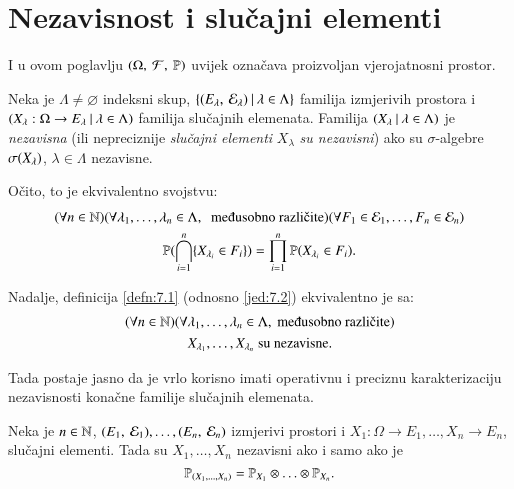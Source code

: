
\chapter{Nezavisnost i slu\v cajni elementi}

I u ovom poglavlju $(\Omega, \: \mathcal{F}, \: \mathbb{P})$ uvijek ozna\v cava proizvoljan vjerojatnosni prostor.

\begin{defn}   \label{defn:7.1}
    Neka je $\Lambda \neq \varnothing$ indeksni skup, $\{{({E_\lambda}, \: {\mathcal{E}_\lambda})} \: | \: {\lambda \in \Lambda}\}$ familija izmjerivih prostora i $({X_\lambda : \Omega \to E_\lambda} \: | \: {\lambda \in \Lambda})$ familija slu\v cajnih elemenata.
    Familija $({X_\lambda} \: | \: {\lambda \in \Lambda})$ je \emph{nezavisna} (ili nepreciznije \emph{slu\v cajni elementi} $X_\lambda$ \emph{su nezavisni}) ako su $\sigma$-algebre $\sigma({X_\lambda})$, $\lambda \in \Lambda$ nezavisne.
\end{defn}

O\v cito, to je ekvivalentno svojstvu:
\begin{equation}    \label{jed:7.2}
    \begin{gathered}
        (\forall n \in \nat) (\forall \lambda_1, \ldots, \lambda_n \in \Lambda, \; \textnormal{ me\dj usobno razli\v cite}) (\forall F_1 \in \famE_1, \ldots, F_n \in \famE_n)\\ 
        \vjeroj{\presjek{i = 1}{n} \{ X_{\lambda_i} \in F_i \}} = \produkt{i = 1}{n} \vjeroj{X_{\lambda_i} \in F_i}.
    \end{gathered}
\end{equation}

Nadalje, definicija \ref{defn:7.1} (odnosno \eqref{jed:7.2}) ekvivalentno je sa:
\begin{equation}    \label{jed:7.3}
    \begin{gathered}
        (\forall n \in \nat) (\forall \lambda_1, \ldots, \lambda_n \in \Lambda, \textnormal{ me\dj usobno razli\v cite})\\
        X_{\lambda_1}, \ldots, X_{\lambda_n} \textnormal{ su nezavisne}.
    \end{gathered}
\end{equation}

Tada postaje jasno da je vrlo korisno imati operativnu i preciznu karakterizaciju nezavisnosti kona\v cne familije slu\v cajnih elemenata.

\begin{tm}  \label{tm:7.4}
    Neka je $n \in \mathbb{N}$, $({E_1}, \: {\mathcal{E}_1}), \ldots, ({E_n}, \: {\mathcal{E}_n})$ izmjerivi prostori i $X_1 : \Omega \to E_1, \ldots, X_n \to E_n$, slu\v cajni elementi.
    Tada su $X_1, \ldots, X_n$ nezavisni ako i samo ako je
    \begin{equation*}
        \mathbb{P}_{({X}_1, \ldots, {X}_n)} = \mathbb{P}_{X_1} \otimes \ldots \otimes \mathbb{P}_{X_n}.
    \end{equation*}
\end{tm}

